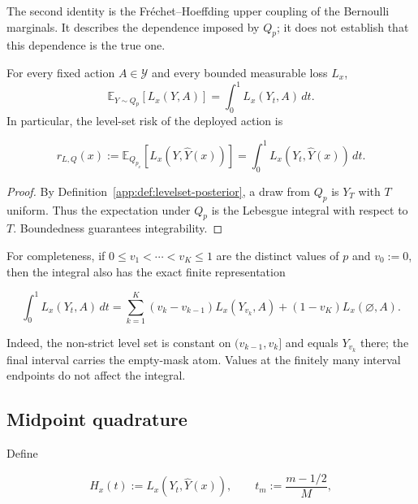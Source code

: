 The second identity is the Fr\'echet--Hoeffding upper coupling of the
Bernoulli marginals.  It describes the dependence imposed by $Q_p$; it
does not establish that this dependence is the true one.

\begin{proposition}
\label{app:prop:threshold-integral}
For every fixed action $A\in\mathcal{Y}$ and every bounded measurable
loss $L_x$,
\begin{equation}
  \mathbb{E}_{Y\sim Q_p}[L_x(Y,A)]
  =\int_0^1 L_x(Y_t,A)\,dt.
  \label{app:eq:threshold-integral}
\end{equation}
In particular, the level-set risk of the deployed action is

\begin{equation}
  r_{L,Q}(x)
  :=\mathbb{E}_{Q_{p_x}}[
      L_x(Y,\widehat Y(x))]
  =\int_0^1L_x(Y_t,\widehat Y(x))\,dt.
  \label{app:eq:levelset-risk}
\end{equation}
\end{proposition}

\begin{proof}
By Definition~\ref{app:def:levelset-posterior}, a draw from $Q_p$ is
$Y_T$ with $T$ uniform.  Thus the expectation under $Q_p$ is the
Lebesgue integral with respect to $T$.  Boundedness guarantees
integrability.
\end{proof}

For completeness, if $0\leq v_1<\cdots<v_K\leq1$ are the distinct
values of $p$ and $v_0:=0$, then the integral also has the exact finite
representation

\begin{equation}
  \int_0^1 L_x(Y_t,A)\,dt
  =\sum_{k=1}^K(v_k-v_{k-1})L_x(Y_{v_k},A)
   +(1-v_K)L_x(\varnothing,A).
  \label{app:eq:exact-knot-sum}
\end{equation}

Indeed, the non-strict level set is constant on
$(v_{k-1},v_k]$ and equals $Y_{v_k}$ there; the final interval carries
the empty-mask atom.  Values at the finitely many interval endpoints do
not affect the integral.

\subsection{Midpoint quadrature}

Define

\begin{equation}
  H_x(t):=L_x(Y_t,\widehat Y(x)),
  \qquad
  t_m:=\frac{m-1/2}{M},
\end{equation}

